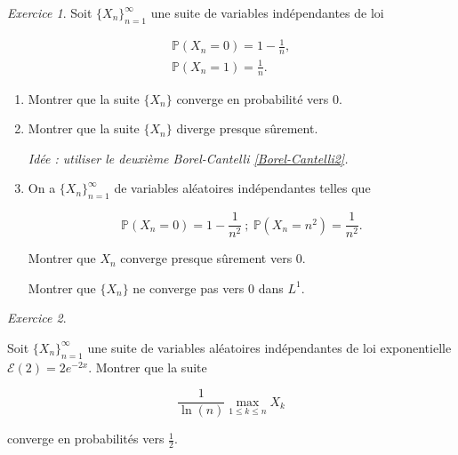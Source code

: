 \documentclass[french]{book}
\theoremstyle{definition}
\theoremstyle{remark}
\newtheorem{exo}{Exercice}
\begin{document}
\begin{exo}
  Soit \(\{ X_n \}_{n=1}^{\infty}\) une suite de variables indépendantes de loi

  \begin{gather*}
    \mathbb{P}(X_n = 0) = 1 - \frac{1}{n}, \\
    \mathbb{P}(X_n = 1) = \frac{1}{n}.
  \end{gather*}

  \begin{enumerate}
    \item Montrer que la suite \(\{ X_n \}\) converge en probabilité vers 0.
    \item Montrer que la suite \(\{ X_n \}\) diverge presque sûrement.

    \emph{Idée : utiliser le deuxième Borel-Cantelli \ref{Borel-Cantelli2}.}

    \item On a \(\{ X_n \}_{n=1}^{\infty}\) de variables aléatoires indépendantes telles que

    \[\mathbb{P}(X_n=0) = 1 - \frac{1}{n ^2} \ ; \ \mathbb{P}(X_n = n ^2) = \frac{1}{n ^2}.\]

    Montrer que \(X_n\) converge presque sûrement vers 0.

    Montrer que \(\{ X_n \}\) ne converge pas vers 0 dans \(L ^{1}\).
  \end{enumerate}
\end{exo}

\begin{exo}
  \
  
  Soit \(\{ X_n \}_{n=1}^{\infty}\) une suite de variables aléatoires indépendantes de loi exponentielle \(\mathscr{E}(2) = 2 e^{- 2x}\). Montrer que la suite

  \[\frac{1}{\ln(n)} \max _{1 \leq k \leq n} X_k\]

  converge en probabilités vers \(\frac{1}{2}\).
\end{exo}
\end{document}
